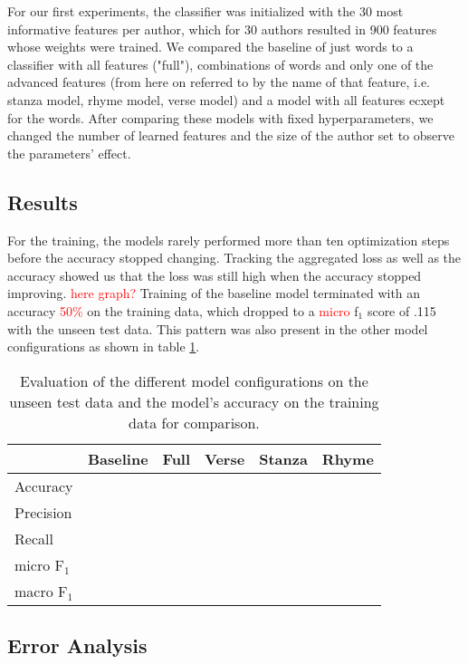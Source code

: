\documentclass[11pt]{article}
\begin{document}
For our first experiments, the classifier was initialized with the 30 most informative features per author, which for
30 authors resulted in 900 features whose weights were trained. We compared the baseline of just words to a classifier 
with all features ("full"), combinations of words and only one of the advanced features (from here on referred to by the name
of that feature, i.e. stanza model, rhyme model, verse model) and a model with all features ecxept for the words.
After comparing these models with fixed hyperparameters, we changed the number of learned features and the size of the 
author set to observe the parameters' effect.

\subsection{Results}
For the training, the models rarely performed more than ten optimization steps before the accuracy stopped changing. 
Tracking the aggregated loss as well as the accuracy showed us that the loss was still high when the accuracy stopped
improving. \textcolor{red}{here graph?} Training of the baseline model terminated with an accuracy \textcolor{red}{50\%} on the training data,
which dropped to a \textcolor{red}{micro} f$_1$ score of .115 with the unseen test data. This pattern was also present in the other model
configurations as shown in table \ref{tab:eval}.

\begin{table}
      \begin{tabular}{lccccc}\hline
            & Baseline & Full & Verse & Stanza & Rhyme\\\hline
            Accuracy & \\
            Precision & \\
            Recall & \\
            micro F$_1$ & \\
            macro F$_1$ & &&&&\\\hline
      \end{tabular}
      \caption{Evaluation of the different model configurations on the unseen test data and the model's
      accuracy on the training data for comparison.}\label{tab:eval}
\end{table}

\subsection{Error Analysis}
\end{document}
